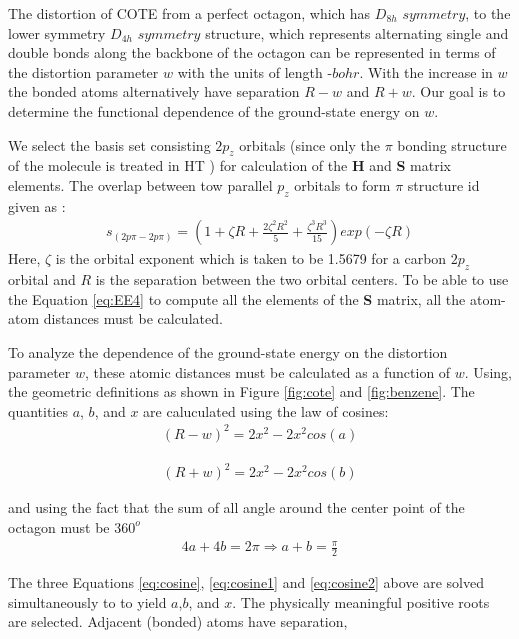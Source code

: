 \documentclass[9pt,twocolumn,twoside]{optica}
\begin{document}
The distortion of COTE from a perfect octagon, which has  $D_{8h}\,\, symmetry$, to the lower symmetry  $D_{4h}\,\, symmetry$  structure, which represents alternating single and double bonds along the backbone of the octagon can be represented in terms of the distortion parameter $w$ with the units of length -$bohr $. With the increase in $w$ the bonded atoms alternatively have separation $R-w$ and $R+w$. Our goal is to determine the functional dependence of the ground-state energy on $w$.

We select the basis set consisting $2p_z$ orbitals (since only the $\pi$ bonding structure of the molecule is treated in HT ) for calculation of the \textbf{H} and\textbf{ S} matrix elements.  The overlap between tow parallel $p_z$ orbitals to form $\pi$ structure id given as :
\begin{align}
s_{(2p\pi - 2p\pi)} =\left( 1+\zeta R + \frac{2 \zeta^2 R^2}{5} +\frac{\zeta^3 R^3}{15}\right)  exp\left( -\zeta R \right)
\label{eq:EE4}
\end{align}
Here, $\zeta$ is the orbital exponent which is taken to be 1.5679 for a carbon $2p_z$ orbital and $R$ is the separation between the two orbital centers.   To be able to use the Equation \ref{eq:EE4} to compute all the elements of the \textbf{S} matrix, all the atom-atom distances must be calculated. 

To analyze the dependence of the ground-state energy on the distortion parameter $w$, these atomic distances must be calculated
as a function of $w$. Using, the geometric definitions as shown in Figure  \ref{fig:cote} and \ref{fig:benzene}. The quantities $a$, $b$, and $x$ are caluculated  using the law of cosines:
\begin{align}
(R-w)^2=2x^2-2x^2cos(a)
\label{eq:cosine}
\end{align}

\begin{align}
(R+w)^2=2x^2-2x^2cos(b)
\label{eq:cosine1}
\end{align}


and using the fact that the sum of all angle around the center point of the octagon must be $360^o$
\begin{align}
4a+4b=2\pi \Rightarrow a+b =\frac{\pi}{2}
\label{eq:cosine2}
\end{align}

The three Equations \ref{eq:cosine}, \ref{eq:cosine1} and  \ref{eq:cosine2} above are solved simultaneously to to yield $a$,$ b$, and $x$. The physically meaningful
positive roots are selected. Adjacent (bonded) atoms have separation,
\end{document}
